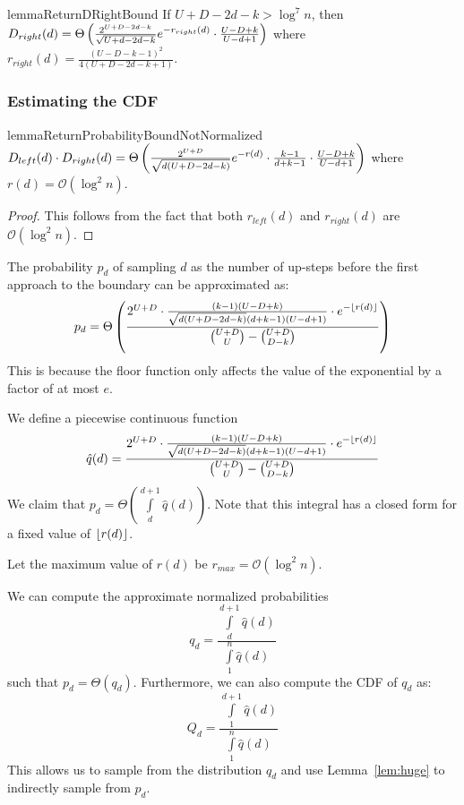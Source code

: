 \begin{restatable}{lemma}{ReturnDRightBound}
\label{lem:ReturnDRightBound}
If $U+D-2d-k > \log^7 n$, then $D_{right}(d)
= \Theta\left( \frac{2^{U+D-2d-k}}{\sqrt{U+d-2d-k}}\mathlarger e^{-r_{right}(d)}\cdot \frac{U-D+k}{U-d+1}\right)$
where $r_{right}(d) = \frac{(U-D-k-1)^2}{4(U+D-2d-k+1)}$.
\end{restatable}


\subsubsection{Estimating the CDF}%
\label{ssub:estimating_the_cdf}

\begin{restatable}{lemma}{ReturnProbabilityBoundNotNormalized}
\label{lem:ReturnProbabilityBoundNotNormalized}
$D_{left}(d)\cdot D_{right}(d)
= \Theta\left( \frac{2^{U+D}}{\sqrt{d(U+D-2d-k)}}\mathlarger e^{-r(d)}\cdot\frac{k-1}{d+k-1}\cdot\frac{U-D+k}{U-d+1}\right)$
where $r(d)=\mathcal O(\log^2 n)$.
\end{restatable}
\begin{proof}
This follows from the fact that both $r_{left}(d)$ and $r_{right}(d)$ are $\mathcal O(\log^2 n)$.
\end{proof}

\begin{corollary}
\label{cor:ReturnProbabilityRounding}
The probability $p_d$ of sampling $d$ as the number of up-steps
before the first approach to the boundary can be approximated as:
\[
p_d = \Theta\left( \frac{ 2^{U+D}\cdot\frac{(k-1)(U-D+k)}{\sqrt{d(U+D-2d-k)}(d+k-1)(U-d+1)}\cdot
\mathlarger e^{-\floor{r(d)}} }{\binom{U+D}{U}-\binom{U+D}{D-k}} \right)
\]
This is because the floor function only affects the value of the exponential by a factor of at most $e$.
\end{corollary}
\begin{corollary}
\label{cor:ReturnProbabilityPiecewiseContinuous}
We define a piecewise continuous function
\[
\hat q(d) = \frac{ 2^{U+D}\cdot\frac{(k-1)(U-D+k)}{\sqrt{d(U+D-2d-k)}(d+k-1)(U-d+1)}\cdot
\mathlarger e^{-\floor{r(d)}} }{\binom{U+D}{U}-\binom{U+D}{D-k}}
\]
We claim that $p_d = \Theta\left( \int\limits_d^{d+1} \hat q(d)\right)$.
Note that this integral has a closed form for a fixed value of $\lfloor r(d)\rfloor$.
\end{corollary}


Let the maximum value of $r(d)$ be $r_{max} = \mathcal O(\log^2 n)$.
\begin{corollary}
\label{cor:}
We can compute the approximate normalized probabilities
\[
q_d = \frac{\int\limits_d^{d+1} \hat q(d)}{\int\limits_1^{n} \hat q(d)}
\]
such that $p_d = \Theta(q_d)$.
Furthermore, we can also compute the CDF of $q_d$ as:
\[
Q_d = \frac{\int\limits_1^{d+1} \hat q(d)}{\int\limits_1^{n} \hat q(d)}
\]
This allows us to sample from the distribution $q_d$ and use Lemma~\ref{lem:huge} to indirectly sample from $p_d$.
\end{corollary}
